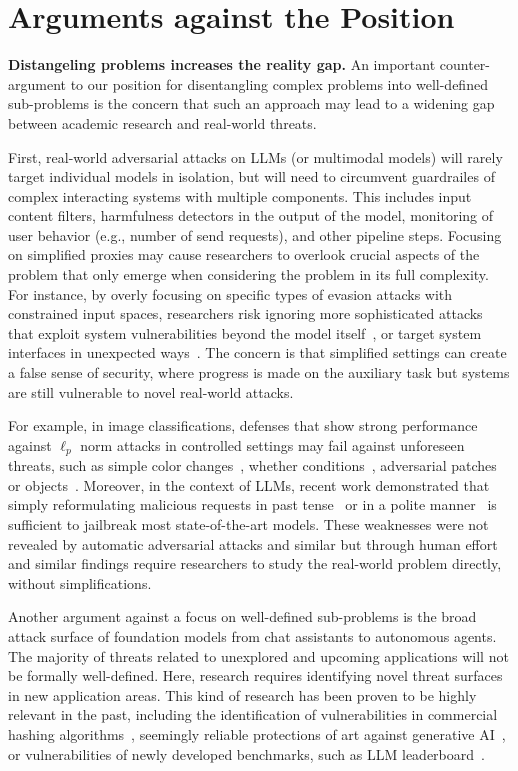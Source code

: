 \section{Arguments against the Position}

\textbf{Distangeling problems increases the reality gap.} An important counter-argument to our position for disentangling complex problems into well-defined sub-problems is the concern that such an approach may lead to a widening gap between academic research and real-world threats. 

First, real-world adversarial attacks on LLMs (or multimodal models) will rarely target individual models in isolation, but will need to circumvent guardrailes of complex interacting systems with multiple components. This includes input content filters, harmfulness detectors in the output of the model, monitoring of user behavior (e.g., number of send requests), and other pipeline steps. Focusing on simplified proxies may cause researchers to overlook crucial aspects of the problem that only emerge when considering the problem in its full complexity. For instance, by overly focusing on specific types of evasion attacks with constrained input spaces, researchers risk ignoring more sophisticated attacks that exploit system vulnerabilities beyond the model itself~\cite{debenedetti2024privacy}, or target system interfaces in unexpected ways~\cite{carlini2024stealing}. The concern is that simplified settings can create a false sense of security, where progress is made on the auxiliary task but systems are still vulnerable to novel real-world attacks. 

For example, in image classifications, defenses that show strong performance against $\ell_p$ norm attacks in controlled settings may fail against unforeseen threats, such as simple color changes~\cite{laidlaw2019functional}, whether conditions~\cite{kaufmann2019testing}, adversarial patches or objects~\cite{song2018physical, athalye2018synthesizing}. Moreover, in the context of LLMs, recent work demonstrated that simply reformulating malicious requests in past tense~\cite{andriushchenko2024does} or in a polite manner~\cite{xhonneux2024efficient} is sufficient to jailbreak most state-of-the-art models. These weaknesses were not revealed by automatic adversarial attacks and similar but through human effort and similar findings require researchers to study the real-world problem directly, without simplifications. 

Another argument against a focus on well-defined sub-problems is the broad attack surface of foundation models from chat assistants to autonomous agents. The majority of threats related to unexplored and upcoming applications will not be formally well-defined. Here, research requires identifying novel threat surfaces in new application areas. This kind of research has been proven to be highly relevant in the past, including the identification of vulnerabilities in commercial hashing algorithms~\cite{levenson2021apple}, seemingly reliable protections of art against generative AI~\cite{honig2024adversarial}, or vulnerabilities of newly developed benchmarks, such as LLM leaderboard~\cite{huang2025exploring}.

